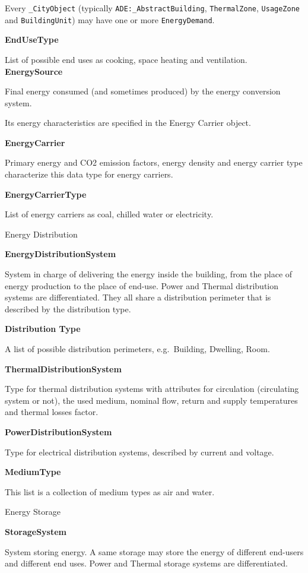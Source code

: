 \documentclass[a4paper,12pt]{article}
\begin{document}
Every \texttt{\_CityObject} (typically \texttt{ADE:\_AbstractBuilding},
\texttt{ThermalZone}, \texttt{UsageZone} and \texttt{BuildingUnit}) may
have one or more \texttt{EnergyDemand}.

\textbf{EndUseType}

List of possible end uses as cooking, space heating and ventilation.
\textbf{EnergySource}

Final energy consumed (and sometimes produced) by the energy conversion
system.

Its energy characteristics are specified in the Energy Carrier object.

\textbf{EnergyCarrier}

Primary energy and CO2 emission factors, energy density and energy
carrier type characterize this data type for energy carriers.

\textbf{EnergyCarrierType}

List of energy carriers as coal, chilled water or electricity.

Energy Distribution

\textbf{EnergyDistributionSystem}

System in charge of delivering the energy inside the building, from the
place of energy production to the place of end-use. Power and Thermal
distribution systems are differentiated. They all share a distribution
perimeter that is described by the distribution type.

\textbf{Distribution Type}

A list of possible distribution perimeters, e.g.~Building, Dwelling,
Room.

\textbf{ThermalDistributionSystem}

Type for thermal distribution systems with attributes for circulation
(circulating system or not), the used medium, nominal flow, return and
supply temperatures and thermal losses factor.

\textbf{PowerDistributionSystem}

Type for electrical distribution systems, described by current and
voltage.

\textbf{MediumType}

This list is a collection of medium types as air and water.

Energy Storage

\textbf{StorageSystem}

System storing energy. A same storage may store the energy of different
end-users and different end uses. Power and Thermal storage systems are
differentiated.
\end{document}
